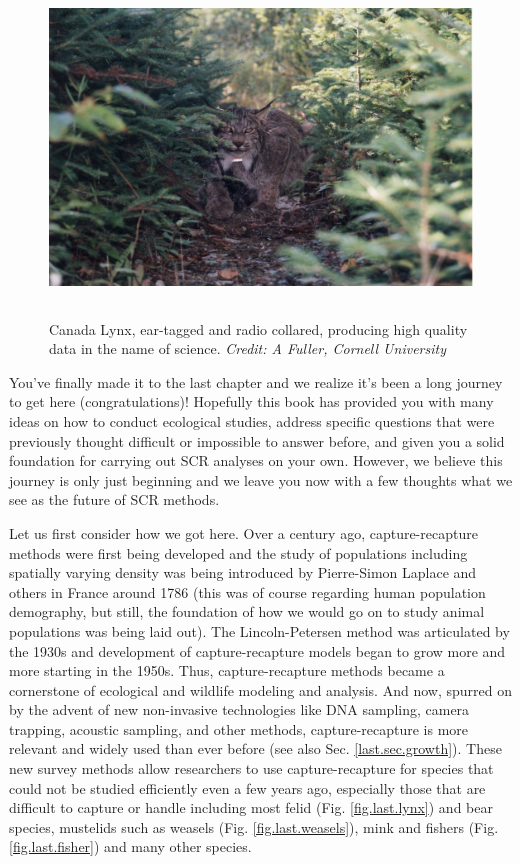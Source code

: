 \begin{figure}[h!]
\centering
\includegraphics[height=3.5in]{Ch20-Last/lynx.jpg}
\caption{
Canada Lynx, ear-tagged and radio collared, producing high quality
data in the name of science.
{\it Credit: A Fuller, Cornell University} }
\label{last.fig.lynx}
\end{figure}

You've finally made it to the last chapter and we realize it's been a long journey to 
get here (congratulations)! Hopefully this book has provided you with many ideas on how 
to conduct ecological studies, address specific questions that were previously
thought difficult or impossible
to answer before, and given you a solid foundation for carrying out SCR analyses 
on your own. However, we believe this journey is only just beginning and we leave you
now with a few thoughts what we see as the future of SCR methods. 

Let us first consider how we got here. Over a century ago, capture-recapture
methods were first being developed and the study of populations including
spatially varying density was being introduced by Pierre-Simon Laplace and others in France around
1786 (this was of course regarding human population demography, but still, the foundation of how 
we would go on to study animal populations was being laid out). 
The Lincoln-Petersen method was articulated by the 1930s and development of
capture-recapture models began to grow more and more starting in the 1950s. 
Thus, capture-recapture methods became a cornerstone of ecological and wildlife
modeling and analysis. And now, spurred on by the advent of 
new non-invasive technologies like DNA
sampling, camera trapping, acoustic sampling, and other methods,
capture-recapture is more relevant and widely used than ever before
(see also Sec. \ref{last.sec.growth}). These new survey methods allow
researchers to use capture-recapture for species that could not be
studied efficiently even a few years ago, especially those that are
difficult to capture or handle including most felid
(Fig. \ref{fig.last.lynx})
and bear
species, mustelids such as weasels (Fig. \ref{fig.last.weasels}), 
mink and fishers (Fig. \ref{fig.last.fisher}) and many other species. 

